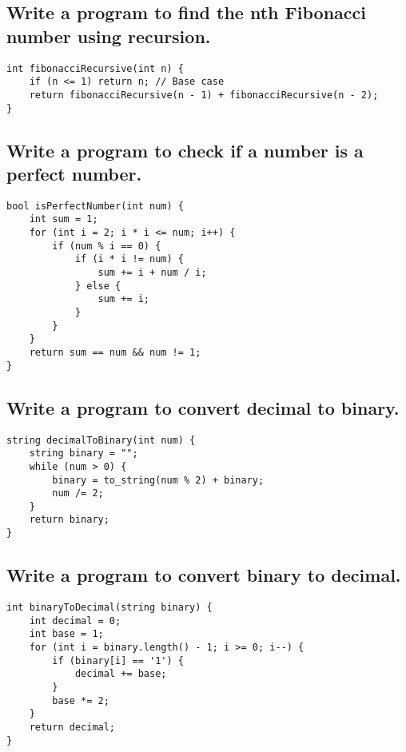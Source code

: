 \subsection{Write a program to find the nth Fibonacci number using recursion.}
\begin{tcolorbox}[title=]
\begin{verbatim}
int fibonacciRecursive(int n) {
    if (n <= 1) return n; // Base case
    return fibonacciRecursive(n - 1) + fibonacciRecursive(n - 2);
}
\end{verbatim}
\end{tcolorbox}


\subsection{Write a program to check if a number is a perfect number.}
\begin{tcolorbox}[title=]
\begin{verbatim} 
bool isPerfectNumber(int num) {
    int sum = 1;
    for (int i = 2; i * i <= num; i++) {
        if (num % i == 0) {
            if (i * i != num) {
                sum += i + num / i;
            } else {
                sum += i;
            }
        }
    }
    return sum == num && num != 1;
}
\end{verbatim}
\end{tcolorbox}


\subsection{Write a program to convert decimal to binary.}
\begin{tcolorbox}[title=]
\begin{verbatim}
string decimalToBinary(int num) {
    string binary = "";
    while (num > 0) {
        binary = to_string(num % 2) + binary;
        num /= 2;
    }
    return binary;
}
\end{verbatim}
\end{tcolorbox}


\subsection{Write a program to convert binary to decimal.}
\begin{tcolorbox}[title=]
\begin{verbatim}
int binaryToDecimal(string binary) {
    int decimal = 0;
    int base = 1;
    for (int i = binary.length() - 1; i >= 0; i--) {
        if (binary[i] == '1') {
            decimal += base;
        }
        base *= 2;
    }
    return decimal;
}
\end{verbatim}
\end{tcolorbox}


